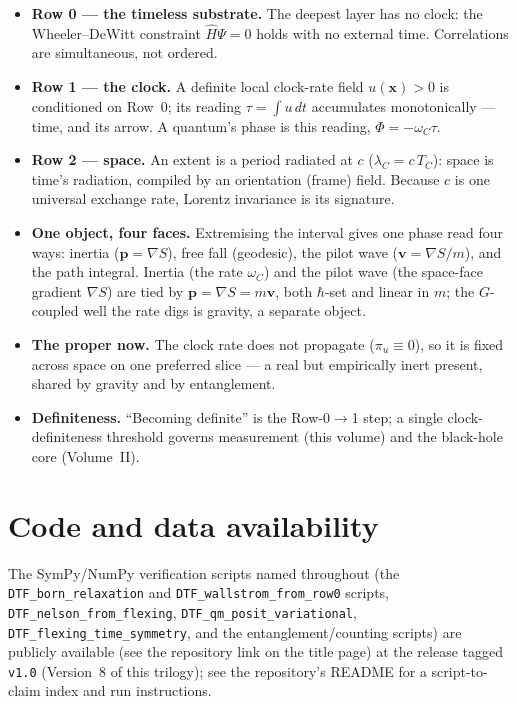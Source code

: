 \documentclass[11pt]{article}
\begin{document}
\begin{itemize}[leftmargin=1.4em,itemsep=3pt,topsep=3pt]
  \item \textbf{Row 0 --- the timeless substrate.} The deepest layer has no clock: the Wheeler--DeWitt
    constraint $\hat H\Psi=0$ holds with no external time. Correlations are simultaneous, not ordered.
  \item \textbf{Row 1 --- the clock.} A definite local clock-rate field $u(\mathbf x)>0$ is conditioned
    on Row~0; its reading $\tau=\int u\,dt$ accumulates monotonically --- time, and its arrow. A
    quantum's phase is this reading, $\Phi=-\omega_C\tau$.
  \item \textbf{Row 2 --- space.} An extent is a period radiated at $c$ ($\lambda_C=c\,T_C$): space is
    time's radiation, compiled by an orientation (frame) field. Because $c$ is one universal exchange
    rate, Lorentz invariance is its signature.
  \item \textbf{One object, four faces.} Extremising the interval gives one phase read four ways: inertia
    ($\mathbf p=\nabla S$), free fall (geodesic), the pilot wave ($\mathbf v=\nabla S/m$), and the path
    integral. Inertia (the rate $\omega_C$) and the pilot wave (the space-face gradient $\nabla S$) are
    tied by $\mathbf p=\nabla S=m\mathbf v$, both $\hbar$-set and linear in $m$; the $G$-coupled well the
    rate digs is gravity, a separate object.
  \item \textbf{The proper now.} The clock rate does not propagate ($\pi_u\equiv0$), so it is fixed
    across space on one preferred slice --- a real but empirically inert present, shared by gravity and
    by entanglement.
  \item \textbf{Definiteness.} ``Becoming definite'' is the Row-0$\to$1 step; a single
    clock-definiteness threshold governs measurement (this volume) and the black-hole core (Volume~II).
\end{itemize}

\section*{Code and data availability}
{\small The SymPy/NumPy verification scripts named throughout (the \texttt{DTF\_born\_relaxation} and
\texttt{DTF\_wallstrom\_from\_row0} scripts, \texttt{DTF\_nelson\_from\_flexing},
\texttt{DTF\_qm\_posit\_variational}, \texttt{DTF\_flexing\_time\_symmetry}, and the entanglement/counting
scripts) are publicly available (see the repository link on the title page) at the release tagged
\texttt{v1.0} (Version~8 of this trilogy); see the repository's README for a script-to-claim index and run
instructions.\par}
\end{document}
